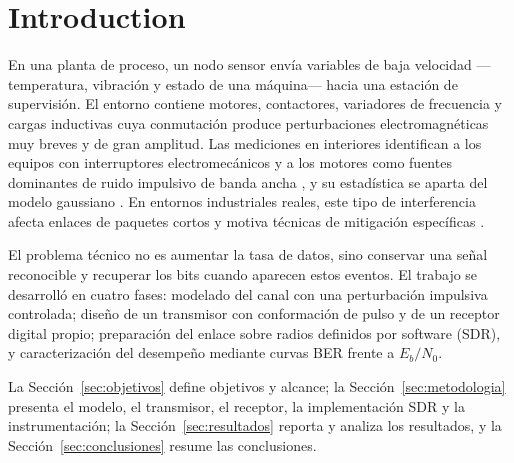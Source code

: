 \section{Introduction}
En una planta de proceso, un nodo sensor envía variables de baja velocidad ---temperatura, vibración y estado de una máquina--- hacia una estación de supervisión. El entorno contiene motores, contactores, variadores de frecuencia y cargas inductivas cuya conmutación produce perturbaciones electromagnéticas muy breves y de gran amplitud. Las mediciones en interiores identifican a los equipos con interruptores electromecánicos y a los motores como fuentes dominantes de ruido impulsivo de banda ancha \cite{blackard1993}, y su estadística se aparta del modelo gaussiano \cite{middleton1977}. En entornos industriales reales, este tipo de interferencia afecta enlaces de paquetes cortos y motiva técnicas de mitigación específicas \cite{zhan2022}.

El problema técnico no es aumentar la tasa de datos, sino conservar una señal reconocible y recuperar los bits cuando aparecen estos eventos. El trabajo se desarrolló en cuatro fases: modelado del canal con una perturbación impulsiva controlada; diseño de un transmisor con conformación de pulso y de un receptor digital propio; preparación del enlace sobre radios definidos por software (SDR), y caracterización del desempeño mediante curvas BER frente a $E_b/N_0$.

La Sección~\ref{sec:objetivos} define objetivos y alcance; la Sección~\ref{sec:metodologia} presenta el modelo, el transmisor, el receptor, la implementación SDR y la instrumentación; la Sección~\ref{sec:resultados} reporta y analiza los resultados, y la Sección~\ref{sec:conclusiones} resume las conclusiones.
